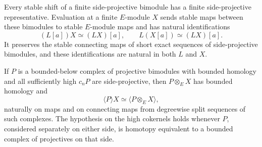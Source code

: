 \begin{lemma}\label{h:evaluation}
Every stable shift of a finite side-projective bimodule has a finite
side-projective representative. Evaluation at a finite $E$-module $X$
sends stable maps between these bimodules to stable $E$-module maps and
has natural identifications
\begin{equation}\label{h:evaluation-shifts}
 (L[a])X\simeq(LX)[a],\qquad L(X[a])\simeq(LX)[a].
\end{equation}
It preserves the stable connecting maps of short exact sequences of
side-projective bimodules, and these identifications are natural in both
$L$ and $X$.

If $P$ is a bounded-below complex of projective bimodules with bounded
homology and all sufficiently high $c_nP$ are side-projective, then
$P\otimes_EX$ has bounded homology and
\begin{equation}\label{h:evaluation-image}
 \langle P\rangle X\simeq\langle P\otimes_EX\rangle,
\end{equation}
naturally on maps and on connecting maps from degreewise split sequences
of such complexes. The hypothesis on the high cokernels holds whenever
$P$, considered separately on either side, is homotopy equivalent to a
bounded complex of projectives on that side.
\end{lemma}

